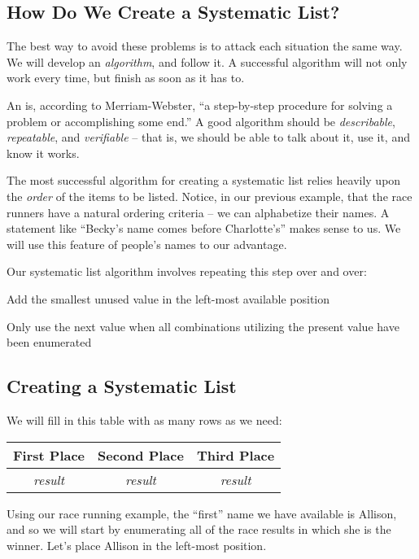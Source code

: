 \subsection{How Do We Create a Systematic List?}

The best way to avoid these problems is to attack each situation the same way.  We will develop an \textit{algorithm}, and follow it.  A successful algorithm will not only work every time, but finish as soon as it has to.

An  is, according to Merriam-Webster, ``a step-by-step procedure for solving a problem or accomplishing some end.''  A good algorithm should be \textit{describable}, \textit{repeatable}, and \textit{verifiable} -- that is, we should be able to talk about it, use it, and know it works.

The most successful algorithm for creating a systematic list relies heavily upon the \textit{order} of the items to be listed.  Notice, in our previous example, that the race runners have a natural ordering criteria -- we can alphabetize their names.  A statement like ``Becky's name comes before Charlotte's'' makes sense to us.  We will use this feature of people's names to our advantage.

Our systematic list algorithm involves repeating this step over and over:
\bi
    \item Add the smallest unused value in the left-most available position
    \item Only use the next value when all combinations utilizing the present value have been enumerated
\ei

\subsection{Creating a Systematic List}

We will fill in this table with as many rows as we need:

\begin{center}
    \begin{tabulary}{\textwidth}{CCC}
        First Place & Second Place & Third Place\\
        \hline
        \textit{result} & \textit{result} & \textit{result}
    \end{tabulary}
\end{center}

Using our race running example, the ``first'' name we have available is Allison, and so we will start by enumerating all of the race results in which she is the winner.  Let's place Allison in the left-most position.

